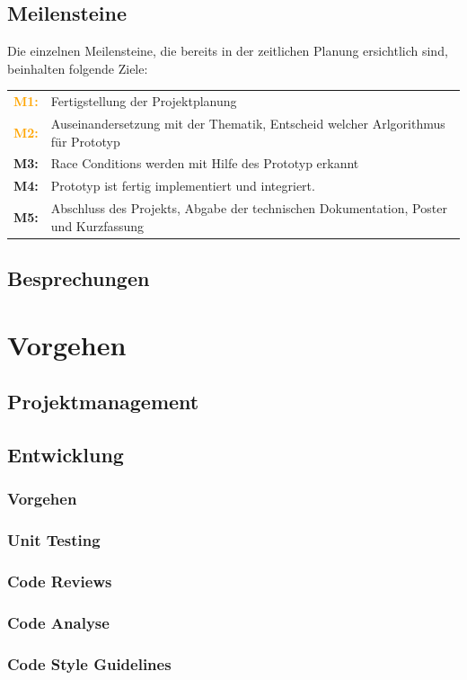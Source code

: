 \documentclass[10pt,a4paper]{article}
\begin{document}
\subsection{Meilensteine}
\begin{flushleft}
	Die einzelnen Meilensteine, die bereits in der zeitlichen Planung ersichtlich sind, beinhalten folgende Ziele:
\end{flushleft}
\begin{tabular}{cl}
	\textcolor{Orange}{\textbf{M1:}} & Fertigstellung der Projektplanung\\[0.2cm]
	\textcolor{Orange}{\textbf{M2:}} & Auseinandersetzung mit der Thematik, Entscheid welcher Arlgorithmus für Prototyp\\[0.2cm]
	\textcolor{NavyBlue}{\textbf{M3:}} & Race Conditions werden mit Hilfe des Prototyp erkannt\\[0.2cm]
	\textcolor{NavyBlue}{\textbf{M4:}} & Prototyp ist fertig implementiert und integriert.\\[0.2cm]
	\textcolor{Dandelion}{\textbf{M5:}} & Abschluss des Projekts, Abgabe der technischen Dokumentation, Poster und Kurzfassung\\
\end{tabular}
\subsection{Besprechungen}
\newpage
\section{Vorgehen}
\subsection{Projektmanagement}
\subsection{Entwicklung}
\subsubsection{Vorgehen}
\subsubsection{Unit Testing}
\subsubsection{Code Reviews}
\subsubsection{Code Analyse}
\subsubsection{Code Style Guidelines}
\end{document}
